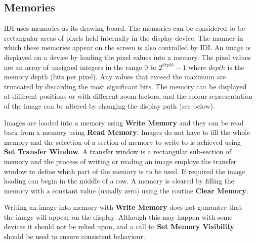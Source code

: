 \documentclass[11pt,nolof]{starlink}
\begin{document}
\subsection{Memories}

IDI uses memories as its drawing board. The memories can be considered to
be rectangular areas of pixels held internally in the display device.
The manner in which these memories appear on the screen is also controlled
by IDI.
An image is displayed on a device by loading the pixel values into a memory.
The pixel values are an array of unsigned integers in the range 0 to
$2^{depth}-1$ where $depth$ is the memory depth (bits per pixel). Any
values that exceed the maximum are truncated by discarding the most
significant bits. The memory can be displayed
at different positions or with different zoom factors, and the colour
representation of the image can be altered by changing the display path
(see below).

Images are loaded into a memory using \textbf{Write Memory} and they can be
read back from a memory using \textbf{Read Memory}. Images do not have to
fill the whole memory and the selection of a section of memory to write
to is achieved using \textbf{Set Transfer Window}. A transfer window is a
rectangular sub-section of memory and the process of writing or reading
an image employs the transfer window to define which part of the
memory is to be used. If required the image
loading can begin in the middle of a row. A memory is cleared by
filling the memory with a constant value (usually zero) using the
routine \textbf{Clear Memory}.

Writing an image into memory with \textbf{Write Memory} does not
guarantee that the image will appear on the display. Although this
may happen with some devices it should not be relied upon, and a
call to \textbf{Set Memory Visibility} should be used to ensure
consistent behaviour.
\end{document}
